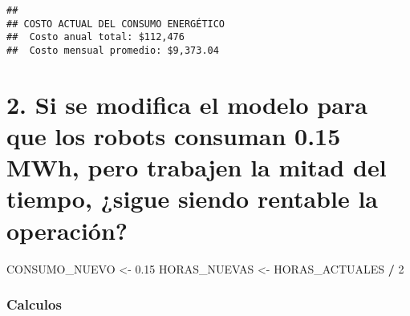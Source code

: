 \documentclass[
]{article}
\newenvironment{Shaded}{\begin{snugshade}}{\end{snugshade}}
\newcommand{\AttributeTok}[1]{\textcolor[rgb]{0.13,0.29,0.53}{#1}}
\newcommand{\DecValTok}[1]{\textcolor[rgb]{0.00,0.00,0.81}{#1}}
\newcommand{\FloatTok}[1]{\textcolor[rgb]{0.00,0.00,0.81}{#1}}
\newcommand{\FunctionTok}[1]{\textcolor[rgb]{0.13,0.29,0.53}{\textbf{#1}}}
\newcommand{\NormalTok}[1]{#1}
\newcommand{\OtherTok}[1]{\textcolor[rgb]{0.56,0.35,0.01}{#1}}
\newcommand{\SpecialCharTok}[1]{\textcolor[rgb]{0.81,0.36,0.00}{\textbf{#1}}}
\begin{document}
\begin{verbatim}
## 
## COSTO ACTUAL DEL CONSUMO ENERGÉTICO
##  Costo anual total: $112,476 
##  Costo mensual promedio: $9,373.04
\end{verbatim}

\section{2. Si se modifica el modelo para que los robots consuman 0.15
MWh, pero trabajen la mitad del tiempo, ¿sigue siendo rentable la
operación?}\label{si-se-modifica-el-modelo-para-que-los-robots-consuman-0.15-mwh-pero-trabajen-la-mitad-del-tiempo-sigue-siendo-rentable-la-operaciuxf3n}

\begin{Shaded}
\begin{Highlighting}[]
\NormalTok{CONSUMO\_NUEVO }\OtherTok{\textless{}{-}} \FloatTok{0.15}
\NormalTok{HORAS\_NUEVAS }\OtherTok{\textless{}{-}}\NormalTok{ HORAS\_ACTUALES }\SpecialCharTok{/} \DecValTok{2}
\end{Highlighting}
\end{Shaded}

\subsubsection{Calculos}\label{calculos-1}

\begin{Shaded}
\end{Shaded}
\end{document}

